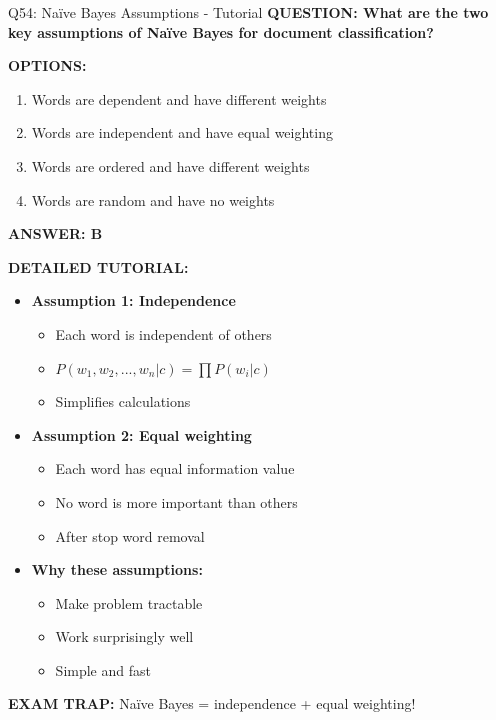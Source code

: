 \documentclass[8pt]{beamer}
\begin{document}
	\begin{frame}{Q54: Naïve Bayes Assumptions - Tutorial}
		\fontsize{6.5}{7.5}\selectfont
		\textbf{QUESTION: What are the two key assumptions of Naïve Bayes for document classification?}
		
		\vspace{0.1cm}
		\textbf{OPTIONS:}
		\begin{enumerate}
			\item Words are dependent and have different weights
			\item Words are independent and have equal weighting
			\item Words are ordered and have different weights
			\item Words are random and have no weights
		\end{enumerate}
		
		\vspace{0.1cm}
		\textcolor{myblue}{\textbf{ANSWER: B}}
		
		\vspace{0.1cm}
		\textbf{DETAILED TUTORIAL:}
		\begin{itemize}
			\item \textbf{Assumption 1: Independence}
			\begin{itemize}
				\item Each word is independent of others
				\item $P(w_1, w_2, ..., w_n|c) = \prod P(w_i|c)$
				\item Simplifies calculations
			\end{itemize}
			\item \textbf{Assumption 2: Equal weighting}
			\begin{itemize}
				\item Each word has equal information value
				\item No word is more important than others
				\item After stop word removal
			\end{itemize}
			\item \textbf{Why these assumptions:}
			\begin{itemize}
				\item Make problem tractable
				\item Work surprisingly well
				\item Simple and fast
			\end{itemize}
		\end{itemize}
		
		\textcolor{myred}{\textbf{EXAM TRAP:}} Naïve Bayes = \textcolor{myblue}{independence + equal weighting}!
	\end{frame}
	
\end{document}
